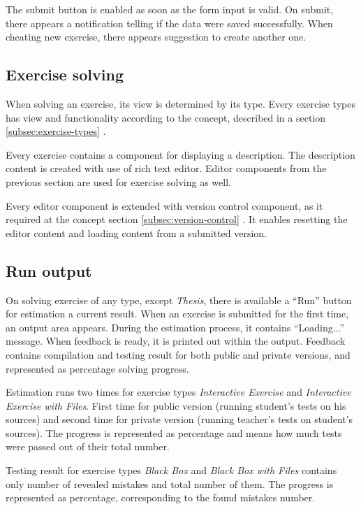         The submit button is enabled as soon as the form input is valid. On submit, there appears a notification telling if the data were saved successfully. When cheating new exercise, there appears suggestion to create another one.
        
        \subsection{Exercise solving}
        When solving an exercise, its view is determined by its type. Every exercise types has view and functionality according to the concept, described in a section \ref{subsec:exercise-types} .
        
        Every exercise contains a component for displaying a description. The description content is created with use of rich text editor. Editor components from the previous section are used for exercise solving as well.
        
        Every editor component is extended with version control component, as it required at the concept section \ref{subsec:version-control} . It enables resetting the editor content and loading content from a submitted version.
        
        \subsection{Run output}
        On solving exercise of any type, except \textit{Thesis}, there is available a ``Run'' button for estimation a current result. When an exercise is submitted for the first time, an output area appears. During the estimation process, it contains ``Loading...'' message. When feedback is ready, it is printed out within the output. Feedback contains compilation and testing result for both public and private versions, and represented as percentage solving progress.
        
        Estimation runs two times for exercise types \textit{Interactive Exercise} and \textit{Interactive Exercise with Files}. First time for public version (running student's tests on his sources) and second time for private version (running teacher's tests on student's sources). The progress is represented as percentage and means how much tests were passed out of their total number.
        
        Testing result for exercise types \textit{Black Box} and \textit{Black Box with Files} contains only number of revealed mistakes and total number of them. The progress is represented as percentage, corresponding to the found mistakes number.
        
